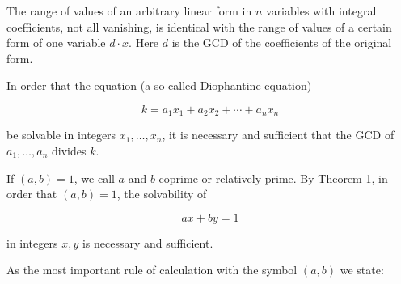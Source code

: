 The range of values of an arbitrary linear form in $n$ variables with integral coefficients, not all vanishing, is identical with the range of values of a certain form of one variable $d \cdot x$. Here $d$ is the GCD of the coefficients of the original form.

In order that the equation (a so-called Diophantine equation)

$$k = a_1x_1 + a_2x_2 + \cdots + a_nx_n$$

be solvable in integers $x_1, \ldots, x_n$, it is necessary and sufficient that the GCD of $a_1, \ldots, a_n$ divides $k$.

If $(a, b) = 1$, we call $a$ and $b$ coprime or relatively prime. By Theorem 1, in order that $(a, b) = 1$, the solvability of

$$ax + by = 1$$

in integers $x, y$ is necessary and sufficient.

As the most important rule of calculation with the symbol $(a, b)$ we state:
